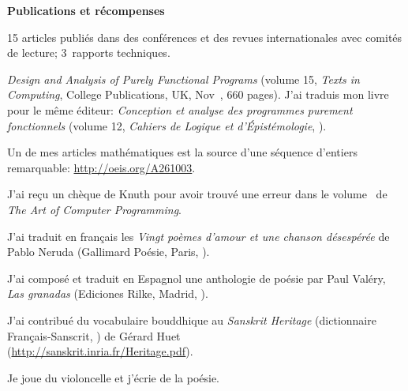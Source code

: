 \documentclass[a4paper,11pt]{article}
\begin{document}
\bigskip
\noindent\textbf{\large Publications et récompenses}
\bigskip
\begin{itemize*}

  \item 15 articles publiés dans des conférences et des revues
    internationales avec comités de lecture; 3~rapports techniques.

  \item \textit{Design and Analysis of Purely Functional Programs}
    (volume 15, \emph{Texts in Computing}, College Publications, UK,
    Nov~, 660 pages). J'ai traduis mon livre pour
    le même éditeur: \textit{Conception et analyse des programmes
      purement fonctionnels} (volume 12, \emph{Cahiers de Logique et
    d'Épistémologie}, ).

  \item Un de mes articles mathématiques est la source d'une séquence
    d'entiers remarquable: \url{http://oeis.org/A261003}.

  \item J'ai reçu un chèque de Knuth pour avoir trouvé une erreur dans
    le volume~ de \emph{The Art of Computer
    Programming}.

  \item J'ai traduit en français les \textit{Vingt poèmes
    d'amour et une chanson désespérée} de Pablo Neruda (Gallimard
    Poésie, Paris, ).

  \item J'ai composé et traduit en Espagnol une anthologie de poésie
    par Paul Valéry, \emph{Las granadas} (Ediciones Rilke, Madrid,
    ).

  \item J'ai contribué du vocabulaire bouddhique au \emph{Sanskrit
    Heritage} (dictionnaire Français-Sanscrit, ) de
    Gérard Huet\\ (\url{http://sanskrit.inria.fr/Heritage.pdf}).

  \item Je joue du violoncelle et j'écrie de la poésie.

\end{itemize*}


%
\nocite{*}
\end{document}
